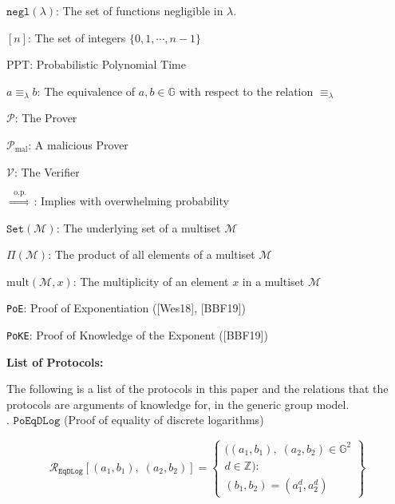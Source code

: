 \documentclass[11pt, lettersize, notitlepage, leqno, footskip=0.6cm]{article}
\newcommand{\ttt}{\texttt}
\newcommand{\negl}{\ttt{{negl}}}
\newcommand{\sett}{\ttt{Set}}
\newcommand{\impop}{\overset{\;\;\mr{o.p.}\;\;}{\Longrightarrow}}
\newcommand{\eqlam}{\equiv_{\lam}}
\newcommand{\mc}{\mathcal}
\newcommand{\mb}{\mathbb}
\newcommand{\mr}{\mathrm}
\newcommand{\lam}{\lambda}
\newcommand{\noin}{\noindent}
\numberwithin{equation}{section}
\begin{document}
{\noindent $\negl(\lam)$: The set of functions negligible in $\lam$. \vspace{0.1cm}

\noindent $[n]$: The set of integers $\{0,1,\cdots,n-1 \}$ \vspace{0.1cm}

\noin PPT: Probabilistic Polynomial Time \vspace{0.1cm}

\noindent $a\eqlam b$: The equivalence of $a,b\in\mb{G}$ with respect to the relation $\eqlam$ \vspace{0.1cm}

\noin $\mc{P}$: The Prover \vspace{0.1cm}

\noin $\mc{P}_{\mr{mal}}$: A malicious Prover \vspace{0.1cm}

\noin $\mc{V}$: The Verifier \vspace{0.1cm}

\noin $\impop$: Implies with overwhelming probability \vspace{0.1cm}

\noin $\sett(\mc{M})$: The underlying set of a multiset $\mc{M}$ \vspace{0.1cm}

\noin $\Pi(\mc{M})$: The product of all elements of a multiset $\mc{M}$ \vspace{0.1cm}

\noin $\mr{mult}(\mc{M},x)$: The multiplicity of an element $x$ in a multiset $\mc{M}$ \vspace{0.1cm}

\noin \verb|PoE|: Proof of Exponentiation ([Wes18], [BBF19])

\noin \verb|PoKE|: Proof of Knowledge of the Exponent ([BBF19])

\bigskip \begin{center} \textbf{List of Protocols:}




\end{center}

The following is a list of the protocols in this paper and the relations that the protocols are arguments of knowledge for, in the generic group model.\\

\noin 1. $\ttt{PoEqDLog}$ (Proof of equality of discrete logarithms) \vspace{-0.3cm}

\[
  \mc{R}_{{\ttt{EqDLog}}}[(a_1, b_1),\;(a_2,b_2)] = \left\{\begin{array}{l}
    ((a_1, b_1), \; (a_2,b_2)\in\mb{G}^2\\
    d\in\mb{Z}): \\
    (b_1,b_2) = (a_1^d,a_2^d)
  \end{array}\right\}
\]

}
\end{document}
